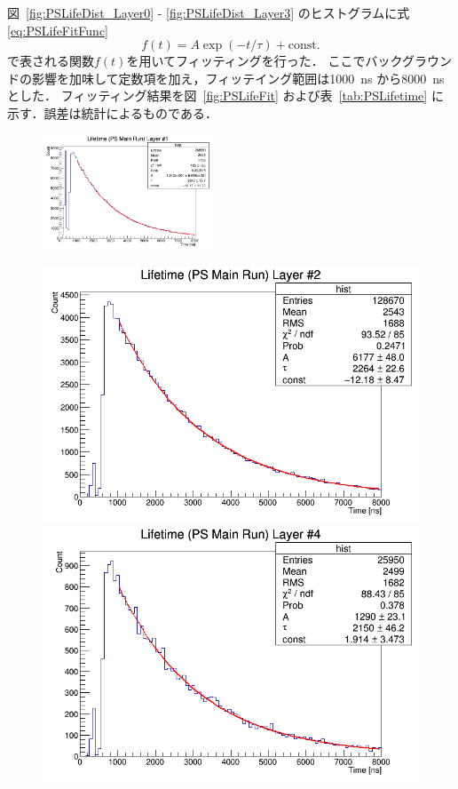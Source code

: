 図~\ref{fig:PSLifeDist_Layer0} - \ref{fig:PSLifeDist_Layer3} のヒストグラムに式\eqref{eq:PSLifeFitFunc} 
\begin{equation}
f(t) = A \exp(-t / \tau) + \mathrm{const.}
\label{eq:PSLifeFitFunc}
\end{equation}
で表される関数$f(t)$を用いてフィッティングを行った．
ここでバックグラウンドの影響を加味して定数項を加え，フィッテイング範囲は1000~ns から8000~ns とした．
フィッティング結果を図~\ref{fig:PSLifeFit} および表~\ref{tab:PSLifetime} に示す．誤差は統計によるものである．
\begin{figure}[h]
	\centering
	\includegraphics[width = 0.45\textwidth]{figure/odagawa/PSLifetimeFit_Layer0.png}\\
	\begin{minipage}{0.45\textwidth}
	\centering
	\includegraphics[width = \textwidth]{figure/odagawa/PSLifetimeFit_Layer1.png}
	\end{minipage}
	\begin{minipage}{0.45\textwidth}
	\centering
	\includegraphics[width = \textwidth]{figure/odagawa/PSLifetimeFit_Layer3.png}

\end{minipage}
\end{figure}

